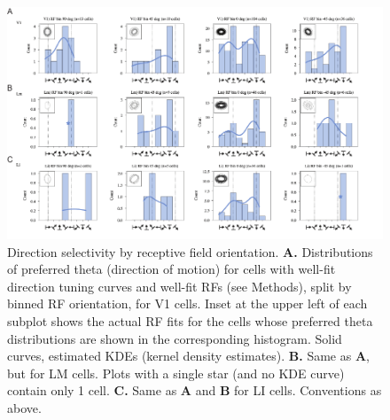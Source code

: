 \begin{figure}[t!]
\includegraphics[width=\textwidth]{figures/supplemental/fig_s11_theta_vs_rf/fig_s11_theta_vs_rf.pdf}
    \vspace{.1in}
    \caption[Direction selectivity and RF orientation]{Direction selectivity by receptive field orientation.
    \textbf{A.} Distributions of preferred theta (direction of motion) for cells with well-fit direction tuning curves and well-fit RFs (see Methods), split by binned RF orientation, for V1 cells. Inset at the upper left of each subplot shows the actual RF fits for the cells whose preferred theta distributions are shown in the corresponding histogram. Solid curves, estimated KDEs (kernel density estimates). 
    \textbf{B.} Same as \textbf{A}, but for LM cells. Plots with a single star (and no KDE curve) contain only 1 cell. 
    \textbf{C.} Same as \textbf{A} and \textbf{B} for LI cells. Conventions as above.
    \label{supfig:theta_vs_rf}}
\end{figure}



